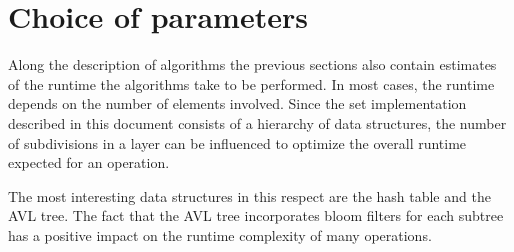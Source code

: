 \section{Choice of parameters}
\label{sec:parameters}

    Along the description of algorithms the previous sections also contain
    estimates of the runtime the algorithms take to be performed.
    In most cases, the runtime depends on the number of elements involved.
    Since the set implementation described in this document consists of
    a hierarchy of data structures, the number of subdivisions in a layer
    can be influenced to optimize the overall runtime expected for an
    operation.

    The most interesting data structures in this respect are the hash table
    and the AVL tree.
    The fact that the AVL tree incorporates bloom filters for each subtree has
    a positive impact on the runtime complexity of many operations.

